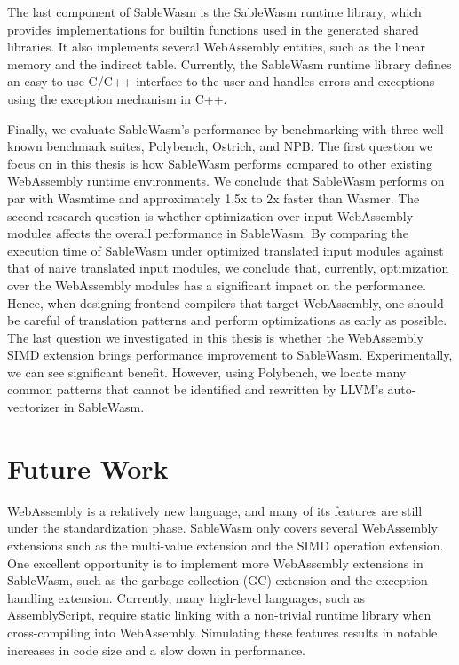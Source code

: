 The last component of SableWasm is the SableWasm runtime library, which provides
implementations for builtin functions used in the generated shared libraries.
It also implements several WebAssembly entities, such as the linear memory and
the indirect table. Currently, the SableWasm runtime library defines an
easy-to-use C/C++ interface to the user and handles errors and exceptions
using the exception mechanism in C++.

Finally, we evaluate SableWasm's performance by benchmarking with three
well-known benchmark suites, Polybench, Ostrich, and NPB. The first question
we focus on in this thesis is how SableWasm performs compared to other existing
WebAssembly runtime environments. We conclude that SableWasm performs on par
with Wasmtime and approximately 1.5x to 2x faster than Wasmer. The second
research question is whether optimization over input WebAssembly modules
affects the overall performance in SableWasm. By comparing the execution time
of SableWasm under optimized translated input modules against that of naive
translated input modules, we conclude that, currently, optimization over the
WebAssembly modules has a significant impact on the performance. Hence, when
designing frontend compilers that target WebAssembly, one should be careful of
translation patterns and perform optimizations as early as possible. The last
question we investigated in this thesis is whether the WebAssembly SIMD
extension brings performance improvement to SableWasm. Experimentally, we can
see significant benefit. However, using Polybench, we locate many common
patterns that cannot be identified and rewritten by LLVM's auto-vectorizer
in SableWasm.

\section*{Future Work}

WebAssembly is a relatively new language, and many of its features are still
under the standardization phase. SableWasm only covers several WebAssembly
extensions such as the multi-value extension and the SIMD operation extension.
One excellent opportunity is to implement more WebAssembly extensions in
SableWasm, such as the garbage collection (GC) extension and the exception
handling extension. Currently, many high-level languages, such as
AssemblyScript, require static linking with a non-trivial runtime library when
cross-compiling into WebAssembly. Simulating these features results in notable
increases in code size and a slow down in performance.

